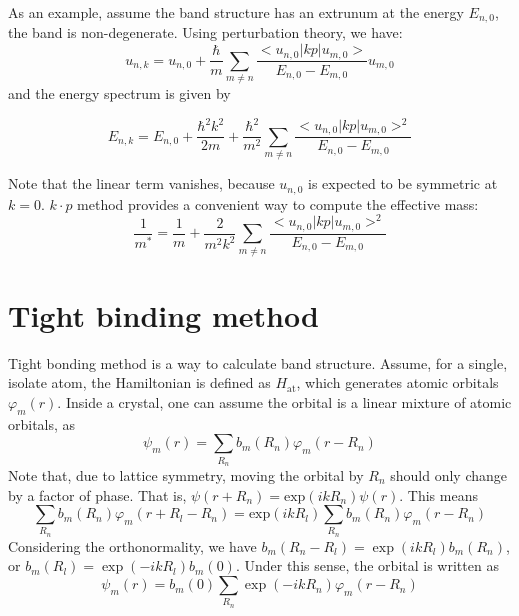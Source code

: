 \documentclass{article}
\begin{document}
As an example, assume the band structure has an extrunum at the energy $E_{n,0}$, the band is non-degenerate. Using perturbation theory, we have:
\begin{equation}
    u_{n, k} = u_{n, 0} + \dfrac{\hbar}{m} \underset{m \neq n}{\sum} \dfrac{< u_{n, 0} | k p | u_{m, 0} >}{E_{n, 0} - E_{m, 0}} u_{m, 0} 
\end{equation}
and the energy spectrum is given by

\begin{equation}
     E_{n, k} = E_{n, 0} + \dfrac{\hbar^2 k^2}{2 m} + \frac{\hbar^2}{m^2} \underset{m \neq n}{\sum} \dfrac{< u_{n, 0} | k p | u_{m, 0} >^2}{E_{n, 0} -   E_{m, 0}} 
\end{equation}

Note that the linear term vanishes, because $u_{n,0}$ is expected to be symmetric at $k=0$. $k\cdot p$ method provides a convenient way to compute the effective mass:
\begin{equation}
    \frac{1}{m^{\text{*}}} = \frac{1}{m} + \frac{2}{m^2 k^2} \underset{m \neq   n}{\sum} \frac{< u_{n, 0} | k p | u_{m, 0} >^2}{E_{n, 0} - E_{m, 0}} 
\end{equation}

\section{Tight binding method}

Tight bonding method is a way to calculate band structure. Assume, for a single, isolate atom, the Hamiltonian is defined as $H_\text{at}$, which generates atomic orbitals $\varphi_m(r)$. Inside a crystal, one can assume the orbital is a linear mixture of atomic orbitals, as
\begin{equation}
    \psi_m (r) = \underset{R_n}{\sum} b_m (R_n) \varphi_m (r - R_n)
\end{equation}
Note that, due to lattice symmetry, moving the orbital by $R_n$ should only change by a factor of phase. That is, $\psi(r+R_n) = \text{exp}(ikR_n)\psi(r)$. This means
\begin{equation}
    \underset{R_n}{\sum} b_m (R_n) \varphi_m (r + R_l - R_n) = \text{exp} (i k R_l)\underset{R_n}{\sum} b_m (R_n) \varphi_m (r - R_n)
\end{equation}
Considering the orthonormality, we have $b_m (R_n - R_l) = \exp (i k R_l) b_m (R_n)$, or  $b_m ( R_l) = \exp (- i k R_l) b_m (0)$. Under this sense, the orbital is written as
\begin{equation}
    \psi_m (r) = b_m (0)\underset{R_n}{\sum} \exp (- i k R_n) \varphi_m(r-R_n)
\end{equation}
\end{document}
